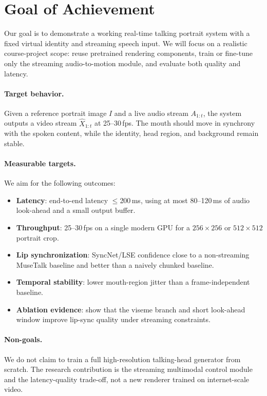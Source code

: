 \documentclass{article}
\begin{document}
\section{Goal of Achievement}

Our goal is to demonstrate a working real-time talking portrait system with a fixed virtual identity and streaming speech input. We will focus on a realistic course-project scope: reuse pretrained rendering components, train or fine-tune only the streaming audio-to-motion module, and evaluate both quality and latency.

\paragraph{Target behavior.}
Given a reference portrait image $I$ and a live audio stream $A_{1:t}$, the system outputs a video stream $\hat{X}_{1:t}$ at 25--30\,fps. The mouth should move in synchrony with the spoken content, while the identity, head region, and background remain stable.

\paragraph{Measurable targets.}
We aim for the following outcomes:
\begin{itemize}
    \item \textbf{Latency}: end-to-end latency $\leq$200\,ms, using at most 80--120\,ms of audio look-ahead and a small output buffer.
    \item \textbf{Throughput}: 25--30\,fps on a single modern GPU for a $256{\times}256$ or $512{\times}512$ portrait crop.
    \item \textbf{Lip synchronization}: SyncNet/LSE confidence close to a non-streaming MuseTalk baseline and better than a naively chunked baseline.
    \item \textbf{Temporal stability}: lower mouth-region jitter than a frame-independent baseline.
    \item \textbf{Ablation evidence}: show that the viseme branch and short look-ahead window improve lip-sync quality under streaming constraints.
\end{itemize}

\paragraph{Non-goals.}
We do not claim to train a full high-resolution talking-head generator from scratch. The research contribution is the streaming multimodal control module and the latency-quality trade-off, not a new renderer trained on internet-scale video.
\end{document}

